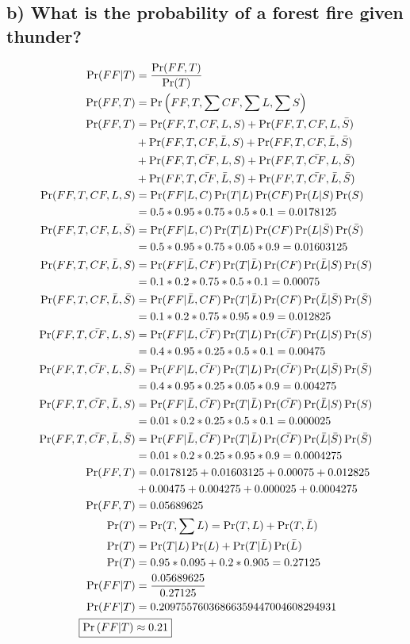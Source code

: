 \documentclass[12pt,letterpaper]{article}
\begin{document}
\subsection{b) What is the probability of a forest fire given thunder?}
\begin{align*}
\Pr(FF|T) &= \frac{\Pr(FF,T)}{\Pr(T)}\\
\Pr(FF,T) &= \Pr\left(FF,T,\sum{CF},\sum{L},\sum{S}\right)\\
\Pr(FF,T) &= \Pr(FF,T,CF,L,S) + \Pr(FF,T,CF,L,\bar{S})\\
&+ \Pr(FF,T,CF,\bar{L},S) + \Pr(FF,T,CF,\bar{L},\bar{S})\\
&+ \Pr(FF,T,\bar{CF},L,S) + \Pr(FF,T,\bar{CF},L,\bar{S})\\
&+ \Pr(FF,T,\bar{CF},\bar{L},S) + \Pr(FF,T,\bar{CF},\bar{L},\bar{S})\\
\Pr(FF,T,CF,L,S) &= \Pr(FF|L,C)\Pr(T|L)\Pr(CF)\Pr(L|S)\Pr(S)\\
&= 0.5*0.95*0.75*0.5*0.1 = 0.0178125\\
\Pr(FF,T,CF,L,\bar{S}) &= \Pr(FF|L,C)\Pr(T|L)\Pr(CF)\Pr(L|\bar{S})\Pr(\bar{S})\\
&= 0.5*0.95*0.75*0.05*0.9 = 0.01603125\\
\Pr(FF,T,CF,\bar{L},S) &= \Pr(FF|\bar{L},CF)\Pr(T|\bar{L})\Pr(CF)\Pr(\bar{L}|S)\Pr(S)\\
&= 0.1*0.2*0.75*0.5*0.1 = 0.00075\\
\Pr(FF,T,CF,\bar{L},\bar{S}) &= \Pr(FF|\bar{L},CF)\Pr(T|\bar{L})\Pr(CF)\Pr(\bar{L}|\bar{S})\Pr(\bar{S})\\
&= 0.1*0.2*0.75*0.95*0.9 = 0.012825\\
\Pr(FF,T,\bar{CF},L,S) &= \Pr(FF|L,\bar{CF})\Pr(T|L)\Pr(\bar{CF})\Pr(L|S)\Pr(S)\\
&= 0.4*0.95*0.25*0.5*0.1 = 0.00475\\
\Pr(FF,T,\bar{CF},L,\bar{S}) &= \Pr(FF|L,\bar{CF})\Pr(T|L)\Pr(\bar{CF})\Pr(L|\bar{S})\Pr(\bar{S})\\
&= 0.4*0.95*0.25*0.05*0.9 = 0.004275\\
\Pr(FF,T,\bar{CF},\bar{L},S) &= \Pr(FF|\bar{L},\bar{CF})\Pr(T|\bar{L})\Pr(\bar{CF})\Pr(\bar{L}|S)\Pr(S)\\
&= 0.01*0.2*0.25*0.5*0.1 = 0.000025\\
\Pr(FF,T,\bar{CF},\bar{L},\bar{S}) &= \Pr(FF|\bar{L},\bar{CF})\Pr(T|\bar{L})\Pr(\bar{CF})\Pr(\bar{L}|\bar{S})\Pr(\bar{S})\\
&= 0.01*0.2*0.25*0.95*0.9 = 0.0004275\\
\Pr(FF,T) &= 0.0178125+0.01603125+0.00075+0.012825\\
&+0.00475+0.004275+0.000025+0.0004275\\
\Pr(FF,T) &= 0.05689625\\
\Pr(T) &= \Pr(T,\sum{L}) = \Pr(T,L) + \Pr(T,\bar{L})\\
\Pr(T) &= \Pr(T|L)\Pr(L) + \Pr(T|\bar{L})\Pr(\bar{L})\\
\Pr(T) &= 0.95*0.095 + 0.2*0.905 = 0.27125\\
\Pr(FF|T) &= \frac{0.05689625}{0.27125}\\
\Pr(FF|T) &= 0.20975576036866359447004608294931\\
\Aboxed{\Pr\left(FF\middle|T\right) &\approx 0.21}
\end{align*}
\end{document}
